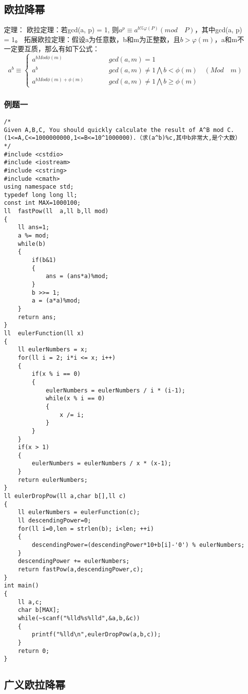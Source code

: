 \subsection{欧拉降幂}
定理：
\newline
欧拉定理：若gcd(a, p) = 1, 则$ a^{p}\equiv a^{b\%\varphi(P)}(mod\quad P) $，其中gcd(a, p) = 1。
\newline
拓展欧拉定理：假设a为任意数，b和m为正整数，且$ b>\varphi(m) $，a和m不一定要互质，那么有如下公式：
\newline
$$
a^b \equiv
\left\{
\begin{array}{lcl}
	a^{bMod\phi(m)} & &\qquad gcd(a,m)=1 \\
	a^b & &\qquad gcd(a,m)\ne 1\bigwedge b<\phi(m)\quad (Mod\quad m) \\
	a^{bMod\phi(m)+\phi(m)} & &\qquad gcd(a,m)\ne 1\bigwedge b \ge\phi(m)
\end{array}
\right.
$$

\subsubsection{例题一}
\begin{lstlisting}
/*
Given A,B,C, You should quickly calculate the result of A^B mod C. (1<=A,C<=1000000000,1<=B<=10^1000000).（求(a^b)%c,其中b非常大,是个大数）
*/
#include <cstdio>
#include <iostream>
#include <cstring>
#include <cmath>
using namespace std;
typedef long long ll;
const int MAX=1000100;
ll  fastPow(ll  a,ll b,ll mod)
{
	ll ans=1;
	a %= mod;
	while(b)
	{
		if(b&1)
		{
			ans = (ans*a)%mod;
		}
		b >>= 1;
		a = (a*a)%mod;
	}
	return ans;
}
ll  eulerFunction(ll x)
{
	ll eulerNumbers = x;
	for(ll i = 2; i*i <= x; i++)
	{
		if(x % i == 0)
		{
			eulerNumbers = eulerNumbers / i * (i-1);
			while(x % i == 0)
			{
				x /= i;
			}
		}
	}
	if(x > 1)
	{
		eulerNumbers = eulerNumbers / x * (x-1);
	}
	return eulerNumbers;
}
ll eulerDropPow(ll a,char b[],ll c)
{
	ll eulerNumbers = eulerFunction(c);
	ll descendingPower=0;
	for(ll i=0,len = strlen(b); i<len; ++i)
	{
		descendingPower=(descendingPower*10+b[i]-'0') % eulerNumbers;
	}
	descendingPower += eulerNumbers;
	return fastPow(a,descendingPower,c);
}
int main()
{
	ll a,c;
	char b[MAX];
	while(~scanf("%lld%s%lld",&a,b,&c))
	{
		printf("%lld\n",eulerDropPow(a,b,c));
	}
	return 0;
}
\end{lstlisting}


\subsection{广义欧拉降幂}

